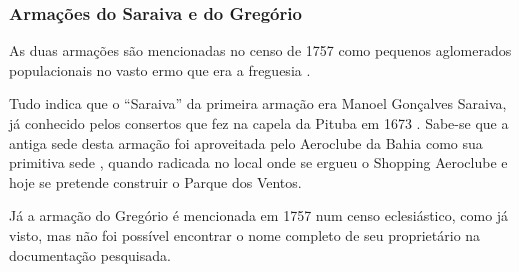 \subsubsection{Armações do Saraiva e do Gregório}

As duas armações são mencionadas no censo de 1757 como pequenos aglomerados populacionais no vasto ermo que era a freguesia \cite[p.~183]{castralmeida_ultramar_1908}.

Tudo indica que o ``Saraiva'' da primeira armação era Manoel Gonçalves Saraiva, já conhecido pelos consertos que fez na capela da Pituba em 1673 \cite[p.~11]{ott_engenhos_1996}. Sabe-se que a antiga sede desta armação foi aproveitada pelo Aeroclube da Bahia como sua primitiva sede \cite[p.~III-11, verso]{teixeira_doacoes_1978}, quando radicada no local onde se ergueu o Shopping Aeroclube e hoje se pretende construir o Parque dos Ventos.

Já a armação do Gregório é mencionada em 1757 num censo eclesiástico, como já visto, mas não foi possível encontrar o nome completo de seu proprietário na documentação pesquisada.